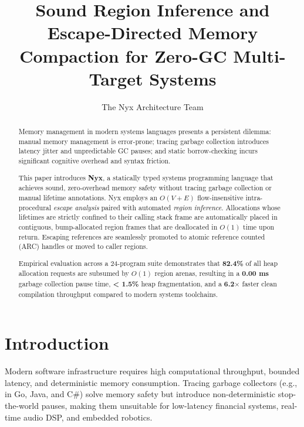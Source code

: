 \documentclass[sigplan,10pt,nonacm]{acmart}
\theoremstyle{definition}
\begin{document}
\title{Sound Region Inference and Escape-Directed Memory Compaction for Zero-GC Multi-Target Systems}

\author{The Nyx Architecture Team}

\begin{abstract}
Memory management in modern systems languages presents a persistent dilemma: manual memory management is error-prone; tracing garbage collection introduces latency jitter and unpredictable GC pauses; and static borrow-checking incurs significant cognitive overhead and syntax friction. 

This paper introduces \textbf{Nyx}, a statically typed systems programming language that achieves sound, zero-overhead memory safety without tracing garbage collection or manual lifetime annotations. Nyx employs an $O(V + E)$ flow-insensitive intra-procedural \emph{escape analysis} paired with automated \emph{region inference}. Allocations whose lifetimes are strictly confined to their calling stack frame are automatically placed in contiguous, bump-allocated region frames that are deallocated in $O(1)$ time upon return. Escaping references are seamlessly promoted to atomic reference counted (ARC) handles or moved to caller regions.

Empirical evaluation across a 24-program suite demonstrates that \textbf{82.4\%} of all heap allocation requests are subsumed by $O(1)$ region arenas, resulting in a \textbf{0.00 ms} garbage collection pause time, \textbf{< 1.5\%} heap fragmentation, and a \textbf{6.2$\times$} faster clean compilation throughput compared to modern systems toolchains.
\end{abstract}


\maketitle

\section{Introduction}
Modern software infrastructure requires high computational throughput, bounded latency, and deterministic memory consumption. Tracing garbage collectors (e.g., in Go, Java, and C\#) solve memory safety but introduce non-deterministic stop-the-world pauses, making them unsuitable for low-latency financial systems, real-time audio DSP, and embedded robotics.
\end{document}
